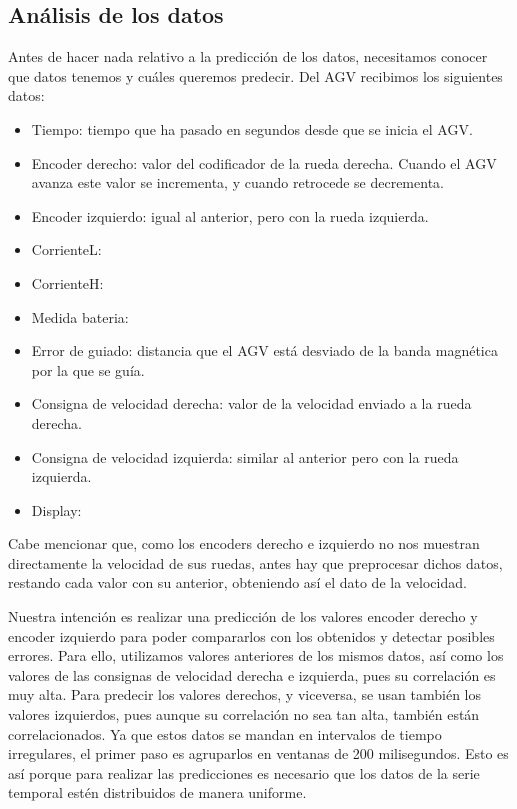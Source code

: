 \subsection{Análisis de los datos}

Antes de hacer nada relativo a la predicción de los datos, necesitamos conocer que datos tenemos y cuáles 
queremos predecir. Del AGV recibimos los siguientes datos:
\begin{itemize}
    \item Tiempo: tiempo que ha pasado en segundos desde que se inicia el AGV.
    \item Encoder derecho: valor del codificador de la rueda derecha. Cuando el AGV avanza este valor se
        incrementa, y cuando retrocede se decrementa.
    \item Encoder izquierdo: igual al anterior, pero con la rueda izquierda.
    \item CorrienteL: %
    \item CorrienteH: %
    \item Medida bateria: %
    \item Error de guiado: distancia que el AGV está desviado de la banda magnética por la que se guía.
    \item Consigna de velocidad derecha: valor de la velocidad enviado a la rueda derecha.
    \item Consigna de velocidad izquierda: similar al anterior pero con la rueda izquierda.
    \item Display: %
\end{itemize}

Cabe mencionar que, como los encoders derecho e izquierdo no nos muestran directamente la velocidad de sus 
ruedas, antes hay que preprocesar dichos datos, restando cada valor con su anterior, obteniendo así el dato de la 
velocidad.


Nuestra intención es realizar una predicción de los valores encoder derecho y encoder izquierdo para poder 
compararlos con los obtenidos y detectar posibles errores. Para ello, utilizamos valores anteriores de los 
mismos datos, así como los valores de las consignas de velocidad derecha e izquierda, pues su correlación 
es muy alta. Para predecir los valores derechos, y viceversa, se usan también los valores izquierdos, pues aunque su 
correlación no sea tan alta, también están correlacionados.
Ya que estos datos se mandan en intervalos de tiempo irregulares, el primer paso es agruparlos en ventanas de 200 milisegundos. 
Esto es así porque para realizar las predicciones es necesario que los datos de la serie temporal estén distribuidos 
de manera uniforme.

